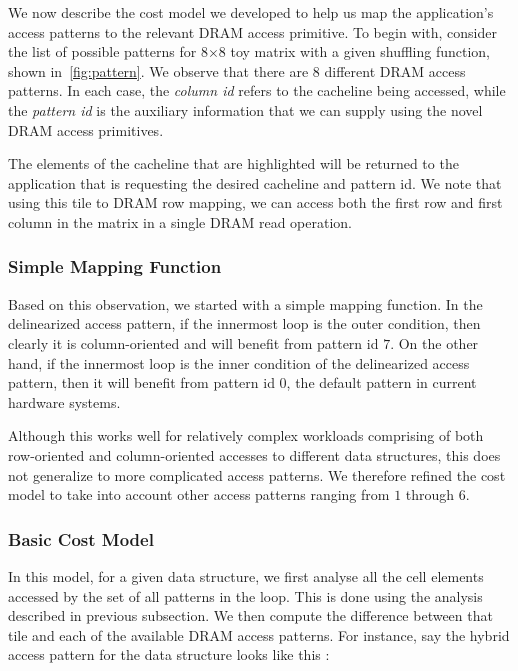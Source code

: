 \documentclass[letterpaper]{article}
\begin{document}
We now describe the cost model we developed to help us map the
application's access patterns to the relevant DRAM access primitive.
To begin with, consider the list of possible patterns for 8$\times$8 
toy matrix with a given shuffling function, shown in~\cref{fig:pattern}. 
We observe that there are $8$ different DRAM access patterns. 
In each case, the \textit{column id} refers to the cacheline being accessed,
while the \textit{pattern id} is the auxiliary information that we can 
supply using the novel DRAM access primitives.

The elements of the cacheline that are highlighted will be returned to the 
application that is requesting the desired cacheline and pattern id.
We note that using this tile to DRAM row mapping, we can access both
the first row and first column in the matrix in a single DRAM read operation.

\subsubsection{Simple Mapping Function}

Based on this observation, we started with a simple mapping function.
In the delinearized access pattern, if the innermost loop is the outer 
condition, then clearly it is column-oriented and will benefit from 
pattern id $7$. On the other hand, if the innermost loop is the inner
condition of the delinearized access pattern, then it will benefit
from pattern id $0$, the default pattern in current hardware systems.

Although this works well for relatively complex workloads comprising
of both row-oriented and column-oriented accesses to different 
data structures, this does not generalize to more complicated access
patterns. We therefore refined the cost model to take into account
other access patterns ranging from $1$ through $6$.

\subsubsection{Basic Cost Model}

In this model, for a given data structure, we first analyse all the cell
elements accessed by the set of all patterns in the loop. This is done
using the analysis described in previous subsection. We then compute
the difference between that tile and each of the available DRAM access patterns.
For instance, say the hybrid access pattern for the data structure looks
like this :
\end{document}
